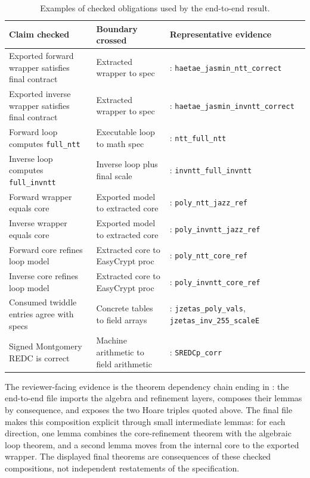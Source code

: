 \documentclass[10pt,twocolumn]{article}
\newcommand{\ec}{EasyCrypt}
\begin{document}
\begin{table}[t]
\centering
\scriptsize
\setlength{\tabcolsep}{3pt}
\begin{tabular}{P{0.31\columnwidth}P{0.25\columnwidth}P{0.34\columnwidth}}
\toprule
Claim checked & Boundary crossed & Representative evidence \\
\midrule
Exported forward wrapper satisfies final contract & Extracted wrapper to spec
& : \texttt{haetae\_jasmin}\newline\texttt{\_ntt\_correct} \\
Exported inverse wrapper satisfies final contract & Extracted wrapper to spec
& : \texttt{haetae\_jasmin}\newline\texttt{\_invntt\_correct} \\
Forward loop computes \texttt{full\_ntt} & Executable loop to math spec
& : \texttt{ntt\_full\_ntt} \\
Inverse loop computes \texttt{full\_invntt} & Inverse loop plus final scale
& : \texttt{invntt\_full\_invntt} \\
Forward wrapper equals core & Exported model to extracted core
& : \texttt{poly\_ntt\_jazz\_ref} \\
Inverse wrapper equals core & Exported model to extracted core
& : \texttt{poly\_invntt\_jazz\_ref} \\
Forward core refines loop model & Extracted core to \ec{} proc
& : \texttt{poly\_ntt\_core\_ref} \\
Inverse core refines loop model & Extracted core to \ec{} proc
& : \texttt{poly\_invntt\_core\_ref} \\
Consumed twiddle entries agree with specs & Concrete tables to field arrays
& : \texttt{jzetas\_poly\_vals}, \texttt{jzetas\_inv\_255\_scaleE} \\
Signed Montgomery REDC is correct & Machine arithmetic to field arithmetic
& : \texttt{SREDCp\_corr} \\
\bottomrule
\end{tabular}
\caption{Examples of checked obligations used by the end-to-end result.}
\label{tab:evidence}
\end{table}

The reviewer-facing evidence is the theorem dependency chain ending in
: the end-to-end file imports the algebra and refinement
layers, composes their lemmas by consequence, and exposes the two Hoare triples
quoted above. The final file makes this composition explicit through small
intermediate lemmas: for each direction, one lemma combines the core-refinement
theorem with the algebraic loop theorem, and a second lemma moves from the
internal core to the exported wrapper. The displayed final theorems are
consequences of these checked compositions, not independent restatements of the
specification.
\end{document}
